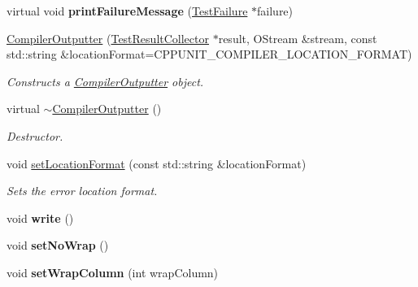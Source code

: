 \begin{DoxyCompactItemize}
\item 
\hypertarget{class_compiler_outputter_abc2ea2f827656d52330b24948eca1f77}{virtual void {\bfseries print\+Failure\+Message} (\hyperlink{class_test_failure}{Test\+Failure} $\ast$failure)}\label{class_compiler_outputter_abc2ea2f827656d52330b24948eca1f77}

\item 
\hyperlink{class_compiler_outputter_a8dd6679e24c18b3ca54a4266d9d1b812}{Compiler\+Outputter} (\hyperlink{class_test_result_collector}{Test\+Result\+Collector} $\ast$result, O\+Stream \&stream, const std\+::string \&location\+Format=C\+P\+P\+U\+N\+I\+T\+\_\+\+C\+O\+M\+P\+I\+L\+E\+R\+\_\+\+L\+O\+C\+A\+T\+I\+O\+N\+\_\+\+F\+O\+R\+M\+A\+T)
\begin{DoxyCompactList}\small\item\em Constructs a \hyperlink{class_compiler_outputter}{Compiler\+Outputter} object. \end{DoxyCompactList}\item 
\hypertarget{class_compiler_outputter_ac74daaf4b355850c5e70b743aac2df82}{virtual \hyperlink{class_compiler_outputter_ac74daaf4b355850c5e70b743aac2df82}{$\sim$\+Compiler\+Outputter} ()}\label{class_compiler_outputter_ac74daaf4b355850c5e70b743aac2df82}

\begin{DoxyCompactList}\small\item\em Destructor. \end{DoxyCompactList}\item 
void \hyperlink{class_compiler_outputter_a0d9e67c7bdcb443b0b2754d61a10790c}{set\+Location\+Format} (const std\+::string \&location\+Format)
\begin{DoxyCompactList}\small\item\em Sets the error location format. \end{DoxyCompactList}\item 
\hypertarget{class_compiler_outputter_a55ca2189956b9b52bdfb1802bf8da445}{void {\bfseries write} ()}\label{class_compiler_outputter_a55ca2189956b9b52bdfb1802bf8da445}

\item 
\hypertarget{class_compiler_outputter_aaa1d8281f8973552a8e9a4568b7d90b4}{void {\bfseries set\+No\+Wrap} ()}\label{class_compiler_outputter_aaa1d8281f8973552a8e9a4568b7d90b4}

\item 
\hypertarget{class_compiler_outputter_ab3559c2aaa88cbccb7c3823b3dd4d247}{void {\bfseries set\+Wrap\+Column} (int wrap\+Column)}\label{class_compiler_outputter_ab3559c2aaa88cbccb7c3823b3dd4d247}


\end{DoxyCompactItemize}
